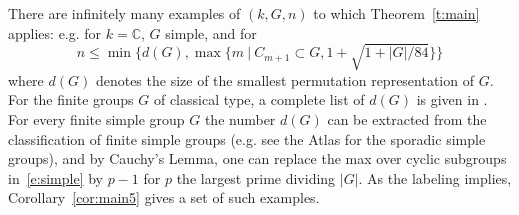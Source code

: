 \documentclass[11pt]{amsart}
\theoremstyle{definition}
\numberwithin{equation}{section}
\newcommand{\Cb}{\mathbb{C}}
\begin{document}
There are infinitely many examples of $(k,G,n)$ to which Theorem~\ref{t:main} applies: e.g. for $k=\Cb$, $G$ simple, and for 
\begin{equation}\label{e:simple}
    n\le \min\{d(G),\max\{m~|~C_{m+1}\subset G,1+\sqrt{1+|G|/84}\}\}
\end{equation} where $d(G)$ denotes the size of the smallest permutation representation of $G$.  For the finite groups $G$ of classical type, a complete list of $d(G)$ is given in \cite[Table 1]{Cooperstein}. For every finite simple group $G$ the number 
$d(G)$ can be extracted from the classification of finite simple groups (e.g. see the Atlas \cite{ATLAS} for the sporadic simple groups), and by Cauchy's Lemma, one can replace the max over cyclic subgroups in~\eqref{e:simple} by $p-1$ for $p$ the largest prime dividing $|G|$. As the labeling implies, Corollary~\ref{cor:main5} gives a set of such examples. 
\end{document}
